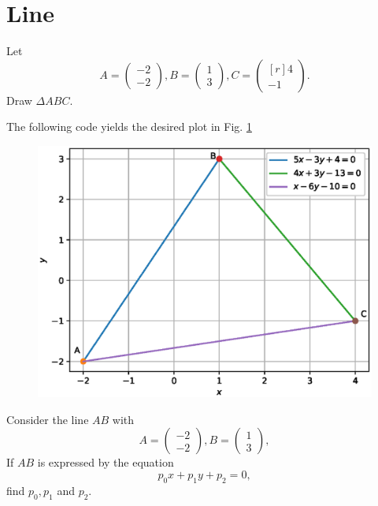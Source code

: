 \documentclass[journal,12pt,twocolumn]{IEEEtran}
\begin{document}
\section{Line}
\begin{problem}
\label{prob:draw_triangle}
Let
\begin{equation}
A =
\begin{pmatrix}
-2
\\
-2
\end{pmatrix},
B =
\begin{pmatrix}
1
\\
3
\end{pmatrix},
C =
\begin{pmatrix*}[r]
4
\\
-1
\end{pmatrix*}.
\end{equation}
Draw $\Delta ABC$.
\end{problem}
\solution
The following code yields the desired plot in Fig. \ref{fig:triangle_def}

\begin{figure}
\centering
\includegraphics[width=\columnwidth]{./figs/triangle.eps}
\caption{}
\label{fig:triangle_def}
\end{figure}
%
\begin{problem}
\label{prob:line_eq}
Consider the line $AB$ with 
\begin{equation}
A =
\begin{pmatrix}
-2
\\
-2
\end{pmatrix},
B =
\begin{pmatrix}
1
\\
3
\end{pmatrix},
\end{equation}
%
If $AB$ is expressed by the equation
\begin{equation}
p_0x + p_1y + p_2 = 0,
\end{equation}
find $p_0,p_1$ and $p_2$.
\end{problem}
\end{document}
